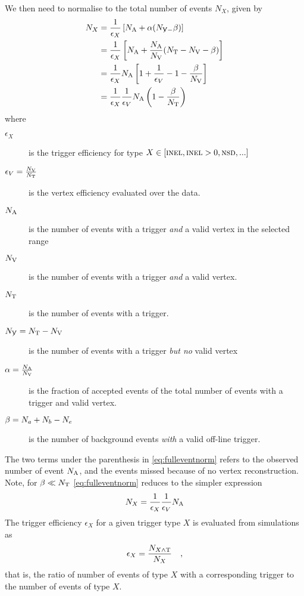 \documentclass[11pt]{article}
\def\AlwaysText#1{\ifmmode\relax\text{#1}\else #1\fi}
\newcommand{\AbbrName}[1]{\AlwaysText{{\scshape #1}}}
\newcommand{\INEL}{\AbbrName{inel}}
\newcommand{\INELONE}{$\AbbrName{inel}>0$}
\newcommand{\NSD}{\AbbrName{nsd}}
\newcommand{\N}[2]{{\ensuremath N_{#1#2}}}
\newcommand{\NV}[1][]{\N{\text{V}}{#1}}
\newcommand{\NnotV}{\N{\not{\text{V}}}}
\newcommand{\NT}{\N{\text{T}}{}}
\newcommand{\NA}{\N{\text{A}}{}}
\begin{document}
We then need to normalise to the total number of events $N_X$, given
by 
\begin{align}
  \N{X}{} &= \frac{1}{\epsilon_X}\left[\NA + \alpha(\NnotV -
    \beta)\right]  \label{eq:fulleventnorm}\\
  & = \frac{1}{\epsilon_X}\left[\NA + \frac{\NA}{\NV}(\NT-\NV{} -
    \beta)\right]\nonumber \\
  & =\frac{1}{\epsilon_X}\NA\left[1+\frac{1}{\epsilon_V}-1-
    \frac{\beta}{\NV}\right]\nonumber\\ 
  & = \frac{1}{\epsilon_X}\frac{1}{\epsilon_V}\NA
  \left(1-\frac{\beta}{\NT{}}\right)\nonumber
\end{align}
where
\begin{description}
\item[$\epsilon_X$]  is the trigger efficiency for type
  $X\in[\text{\INEL},\text{\INELONE},\text{\NSD},...]$
\item[$\epsilon_V=\frac{\NV{}}{\NT{}}$] is the vertex efficiency
  evaluated over the data.
\item[$\NA$] is the number of events with a trigger \emph{and} a valid
  vertex in the selected range
\item[$\NV{}$] is the number of events with a trigger \emph{and} a valid
  vertex. 
\item[$\NT$] is the number of events with a trigger.
\item[$\NnotV{}=\NT-\NV{}$] is the number of events with a trigger
  \emph{but no} valid vertex
\item[$\alpha=\frac{\NA}{\NV}$] is the fraction of accepted events of
  the total number of events with a trigger and valid vertex.  
\item[$\beta=\N{a}{}+\N{b}{}-\N{e}{}$] is the number of background
  events \emph{with} a valid off-line trigger.
\end{description}
The two terms under the parenthesis in \eqref{eq:fulleventnorm} refers
to the observed number of event $\NA$, and the events missed because
of no vertex reconstruction.  Note, for $\beta\ll\NT{}$
\eqref{eq:fulleventnorm} reduces to the simpler expression
$$
\N{X}{} = \frac1{\epsilon_X}\frac1{\epsilon_V}\NA{}
$$
The trigger efficiency $\epsilon_X$ for a given trigger type $X$ is
evaluated from simulations as
\begin{align}
  \epsilon_X = \frac{\N{X\wedge \text{T}}{}}{\N{X}{}}\quad,
\end{align}
that is, the ratio of number of events of type $X$ with a
corresponding trigger to the number of events of type $X$. 
\end{document}
